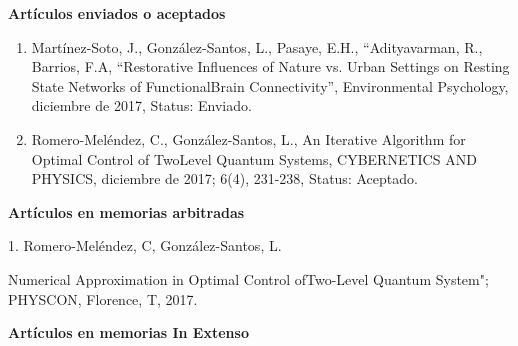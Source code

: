 \documentclass[12pt]{article}
\begin{document}
\textbf{Artículos enviados o aceptados}

\begin{enumerate}
\item Martínez-Soto, J., González-Santos, L., Pasaye, E.H., “Adityavarman, R., Barrios, F.A, “Restorative Influences of Nature vs. 
Urban 
Settings on Resting State Networks of FunctionalBrain Connectivity”, Environmental Psychology, diciembre de 2017, Status: Enviado.

\item Romero-Meléndez, C., González-Santos, L., An Iterative Algorithm for Optimal Control of TwoLevel Quantum Systems, CYBERNETICS AND 
PHYSICS, diciembre de 2017; 6(4), 231-238, Status: Aceptado.
\end{enumerate}

\textbf{Artículos en memorias arbitradas}

\hfill

1. Romero-Meléndez, C, González-Santos, L.

Numerical Approximation in Optimal Control ofTwo-Level Quantum System"; PHYSCON, Florence, T, 2017.

\hfill

\textbf{Artículos en memorias In Extenso}
\end{document}
